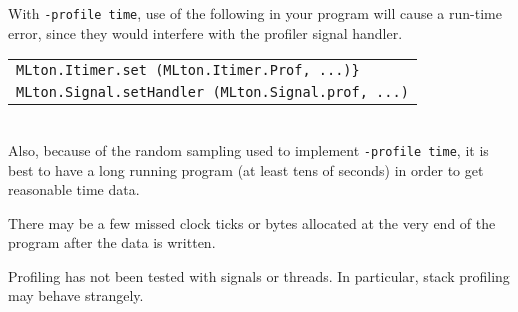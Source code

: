 With {\tt -profile time}, use of the following in your program will
cause a run-time error, since they would interfere with the profiler
signal handler.\\
\begin{tabular}{l}
\tt MLton.Itimer.set (MLton.Itimer.Prof, ...)\}\\
\tt MLton.Signal.setHandler (MLton.Signal.prof, ...)
\end{tabular}\\
Also, because of the random sampling used to implement {\tt -profile
time}, it is best to have a long running program (at least tens of
seconds) in order to get reasonable time data.

There may be a few missed clock ticks or bytes allocated at the
very end of the program after the data is written.

Profiling has not been tested with signals or threads.  In particular,
stack profiling may behave strangely.
